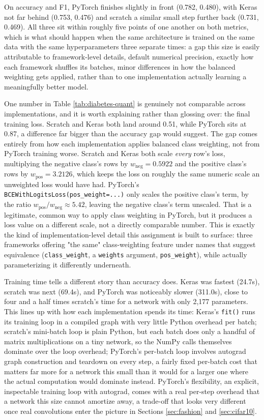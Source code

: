 \documentclass[11pt]{article}
\newcommand{\code}[1]{\texttt{#1}}
\begin{document}
On accuracy and F1, PyTorch finishes slightly in front (0.782, 0.480), with
Keras not far behind (0.753, 0.476) and scratch a similar small step further
back (0.731, 0.469). All three sit within roughly five points of one another
on both metrics, which is what should happen when the same architecture is
trained on the same data with the same hyperparameters three separate times:
a gap this size is easily attributable to framework-level details, default
numerical precision, exactly how each framework shuffles its batches, minor
differences in how the balanced weighting gets applied, rather than to one
implementation actually learning a meaningfully better model.

One number in Table \ref{tab:diabetes-quant} is genuinely not comparable
across implementations, and it is worth explaining rather than glossing over:
the final training loss. Scratch and Keras both land around 0.51, while
PyTorch sits at 0.87, a difference far bigger than the accuracy gap would
suggest. The gap comes entirely from how each implementation applies balanced
class weighting, not from PyTorch training worse. Scratch and Keras both
scale \textit{every} row's loss, multiplying the negative class's rows by
$w_{\text{neg}} = 0.5922$ and the positive class's rows by
$w_{\text{pos}} = 3.2126$, which keeps the loss on roughly the same numeric
scale an unweighted loss would have had. PyTorch's
\code{BCEWithLogitsLoss(pos\_weight=...)} only scales the positive class's
term, by the ratio $w_{\text{pos}} / w_{\text{neg}} \approx 5.42$, leaving the
negative class's term unscaled. That is a legitimate, common way to apply
class weighting in PyTorch, but it produces a loss value on a different
scale, not a directly comparable number. This is exactly the kind of
implementation-level detail this assignment is built to surface: three
frameworks offering "the same" class-weighting feature under names that
suggest equivalence (\code{class\_weight}, a \code{weights} argument,
\code{pos\_weight}), while actually parameterizing it differently underneath.

Training time tells a different story than accuracy does. Keras was fastest
(24.7s), scratch was next (69.4s), and PyTorch was noticeably slower (311.0s),
close to four and a half times scratch's time for a network with only 2,177
parameters. This lines up with how each implementation spends its time:
Keras's \code{fit()} runs its training loop in a compiled graph with very
little Python overhead per batch; scratch's mini-batch loop is plain Python,
but each batch does only a handful of matrix multiplications on a tiny
network, so the NumPy calls themselves dominate over the loop overhead;
PyTorch's per-batch loop involves autograd graph construction and teardown on
every step, a fairly fixed per-batch cost that matters far more for a network
this small than it would for a larger one where the actual computation would
dominate instead. PyTorch's flexibility, an explicit, inspectable training
loop with autograd, comes with a real per-step overhead that a network this
size cannot amortize away, a trade-off that looks very different once real
convolutions enter the picture in Sections \ref{sec:fashion} and
\ref{sec:cifar10}.
\end{document}
